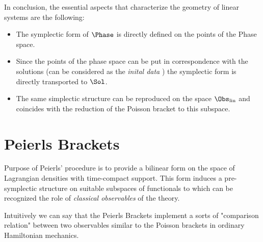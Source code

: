 \documentclass[Main]{subfiles}
\begin{document}
	
			In conclusion, the essential aspects that characterize the geometry of linear systems are the following:
		\begin{itemize}
			\item The symplectic form of $\Phase$ is directly defined on the points of the Phase space.
			\item Since the points of the phase space can be put in correspondence with the solutions (can be considered as the \emph{inital data} ) the symplectic form is directly transported to $\Sol$.
			\item The same simplectic structure can be reproduced on the space $\Obs_\textrm{lin}$ and coincides with the reduction of the Poisson bracket to this subspace.
			\end{itemize}


	\section{Peierls Brackets}
		Purpose of Peierls' procedure is to provide a bilinear form on the space of Lagrangian densities with time-compact support.
		This form induces a pre-symplectic structure on suitable subspaces of functionals to which can be recognized the role of \emph{classical observables}  of the theory.	

	\vspace{2mm}	
		Intuitively we can say that the Peierls Brackets implement a sorts of "comparison relation" between two observables similar to the Poisson brackets in ordinary Hamiltonian mechanics.
		
\end{document}
